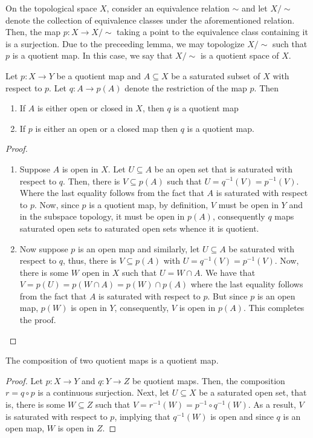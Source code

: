On the topological space $X$, consider an equivalence relation $\sim$ and let $X/\sim$ denote the collection of equivalence classes under the aforementioned relation. Then, the map $p: X\to X/\sim$ taking a point to the equivalence class containing it is a surjection. Due to the preceeding lemma, we may topologize $X/\sim$ such that $p$ is a quotient map. In this case, we say that $X/\sim$ is a quotient space of $X$.

\begin{theorem}
    Let $p: X\to Y$ be a quotient map and $A\subseteq X$ be a saturated subset of $X$ with respect to $p$. Let $q: A\to p(A)$ denote the restriction of the map $p$. Then 
    \begin{enumerate}
    \item If $A$ is either open or closed in $X$, then $q$ is a quotient map 
    \item If $p$ is either an open or a closed map then $q$ is a quotient map.
    \end{enumerate}
\end{theorem}
\begin{proof}
\begin{enumerate}
\item Suppose $A$ is open in $X$. Let $U\subseteq A$ be an open set that is saturated with respect to $q$. Then, there is $V\subseteq p(A)$ such that $U = q^{-1}(V) = p^{-1}(V)$. Where the last equality follows from the fact that $A$ is saturated with respect to $p$. Now, since $p$ is a quotient map, by definition, $V$ must be open in $Y$ and in the subspace topology, it must be open in $p(A)$, consequently $q$ maps saturated open sets to saturated open sets whence it is quotient.

\item Now suppose $p$ is an open map and similarly, let $U\subseteq A$ be saturated with respect to $q$, thus, there is $V\subseteq p(A)$ with $U = q^{-1}(V) = p^{-1}(V)$. Now, there is some $W$ open in $X$ such that $U =  W\cap A$. We have that $V = p(U) = p(W\cap A) = p(W)\cap p(A)$ where the last equality follows from the fact that $A$ is saturated with respect to $p$. But since $p$ is an open map, $p(W)$ is open in $Y$, consequently, $V$ is open in $p(A)$. This completes the proof.
\end{enumerate}
\end{proof}

\begin{lemma}
    The composition of two quotient maps is a quotient map.
\end{lemma}
\begin{proof}
    Let $p: X\to Y$ and $q: Y\to Z$ be quotient maps. Then, the composition $r = q\circ p$ is a continuous surjection. Next, let $U\subseteq X$ be a saturated open set, that is, there is some $W\subseteq Z$ such that $V = r^{-1}(W) = p^{-1}\circ q^{-1}(W)$. As a result, $V$ is saturated with respect to $p$, implying that $q^{-1}(W)$ is open and since $q$ is an open map, $W$ is open in $Z$. 
\end{proof}

